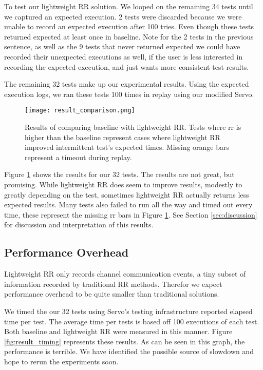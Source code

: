To test our lightweight RR solution. We looped on the remaining 34 tests until
we captured an expected execution. 2 tests were
discarded because we were unable to record an expected execution after 100
tries. Even though these tests returned expected at least once in baseline. Note
for the 2 tests in the previous sentence, as well as the 9 tests that never returned
expected we could have recorded their unexpected executions as well, if the user
is less interested in recording the expected execution, and just wants more consistent
test results.

The remaining 32 tests make up our experimental results. Using the expected execution
logs, we ran these tests 100 times in replay using our modified Servo.

\begin{figure}
  \texttt{[image: result\_comparison.png]}
  \caption{Results of comparing baseline with lightweight RR. Tests where rr
    is higher than the baseline represent cases where lightweight RR improved intermittent
    test's expected times. Missing orange bars represent a timeout during replay. }
  \label{fig:result1}
\end{figure}

Figure \ref{fig:result1} shows the results for our 32 tests. The results are
not great, but promising. While lightweight RR does seem to improve results,
modestly to greatly depending on the test, sometimes lightweight RR actually returns
less expected results. Many tests also failed to run all the way and timed out
every time, these represent the missing rr bars in Figure \ref{fig:result1}. See Section \ref{sec:discussion} for discussion and interpretation of this results.

\subsection{Performance Overhead}
Lightweight RR only records channel communication events, a tiny subset of information
recorded by traditional RR methods. Therefor we expect performance overhead to be quite
smaller than traditional solutions.

We timed the our 32 tests using Servo's testing infrastructure reported elapsed time
per test. The average time per tests is based off 100 executions of each test. Both
baseline and lightweight RR were measured in this manner. Figure \ref{fig:result_timing}
represents these results. As can be seen in this graph, the performance is terrible.
We have identified the possible source of slowdown and hope to rerun the experiments
soon.

